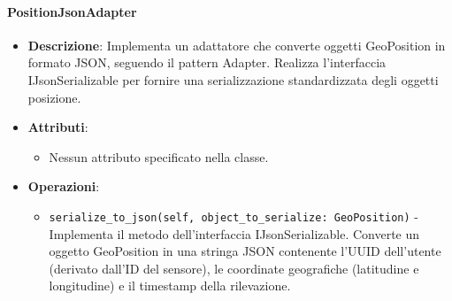 \documentclass[10pt]{article}
\begin{document}
    \paragraph{PositionJsonAdapter}
    \begin{itemize} 
    \item \textbf{Descrizione}: Implementa un adattatore che converte oggetti GeoPosition in formato JSON, seguendo il pattern Adapter. Realizza l'interfaccia IJsonSerializable per fornire una serializzazione standardizzata degli oggetti posizione.
    \item \textbf{Attributi}:
    \begin{itemize}
        \item Nessun attributo specificato nella classe.
    \end{itemize}
    
    \item \textbf{Operazioni}:
    \begin{itemize}
        \item \texttt{serialize\_to\_json(self, object\_to\_serialize: GeoPosition)} - Implementa il metodo dell'interfaccia IJsonSerializable. Converte un oggetto GeoPosition in una stringa JSON contenente l'UUID dell'utente (derivato dall'ID del sensore), le coordinate geografiche (latitudine e longitudine) e il timestamp della rilevazione.
    \end{itemize}
    \end{itemize}
\end{document}
